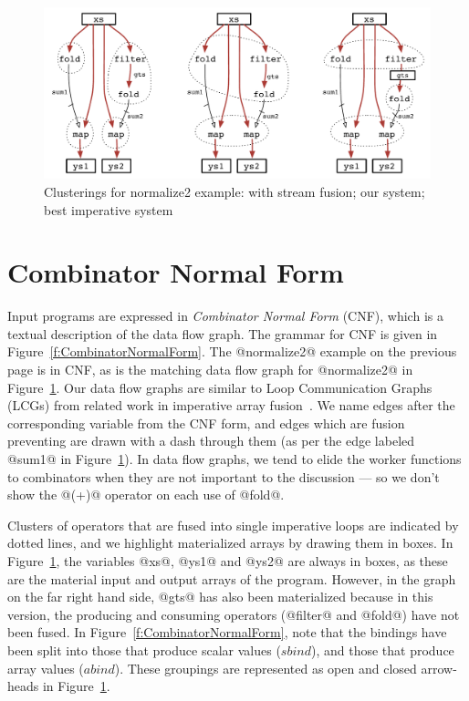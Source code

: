
\begin{figure}[ht!]
\begin{center}
\includegraphics[scale=0.5]{figures/ex1-compare.pdf}
\end{center}
\caption{Clusterings for normalize2 example: with stream fusion; our system; best imperative system}
\label{f:normalize2-clusterings}
\end{figure}


\section{Combinator Normal Form}
\label{s:CombinatorNormalForm}
Input programs are expressed in \emph{Combinator Normal Form} (CNF), which is a textual description of the data flow graph. The grammar for CNF is given in Figure~\ref{f:CombinatorNormalForm}. The @normalize2@  example on the previous page is in CNF,  as is the matching data flow graph for @normalize2@ in Figure~\ref{f:normalize2-clusterings}. Our data flow graphs are similar to Loop Communication Graphs (LCGs) from related work in imperative array fusion~\cite{gao1993collective}. We name edges after the corresponding variable from the CNF form, and edges which are fusion preventing are drawn with a dash through them (as per the edge labeled @sum1@ in Figure~\ref{f:normalize2-clusterings}). In data flow graphs, we tend to elide the worker functions to combinators when they are not important to the discussion --- so we don't show the @(+)@ operator on each use of @fold@.

Clusters of operators that are fused into single imperative loops are indicated by dotted lines, and we highlight materialized arrays by drawing them in boxes. In Figure~\ref{f:normalize2-clusterings}, the variables @xs@, @ys1@ and @ys2@ are always in boxes, as these are the material input and output arrays of the program. However, in the graph on the far right hand side, @gts@ has also been materialized because in this version, the producing and consuming operators (@filter@ and @fold@) have not been fused. In Figure~\ref{f:CombinatorNormalForm}, note that the bindings have been split into those that produce scalar values ($sbind$), and those that produce array values ($abind$). These groupings are represented as open and closed arrow-heads in Figure~\ref{f:normalize2-clusterings}.

